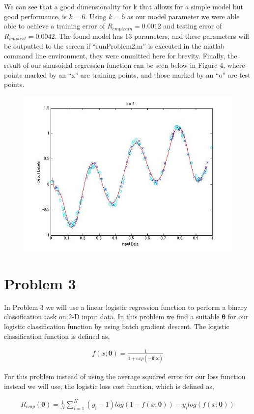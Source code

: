 \documentclass[paper=a4, fontsize=11pt]{scrartcl} %
\numberwithin{equation}{section} %
\numberwithin{figure}{section} %
\numberwithin{table}{section} %
\begin{document}
We can see that a good dimensionality for k that allows for a simple model but good performance, is $k=6$.  Using $k = 6$ as our model parameter we were able able to achieve a training error of $R_{emptrain} = 0.0012$ and testing error of $R_{emptest} = 0.0042$.  The found model has 13 parameters, and these parameters will be outputted to the screen if ``runProblem2.m'' is executed in the matlab command line environment, they were ommitted here for brevity.
Finally, the result of our sinusoidal regression function can be seen below in Figure 4, where points marked by an ``x'' are training points, and those marked by an ``o'' are test points.

\begin{figure}
\centering
\includegraphics[scale=0.4]{prob2curve.jpg}
\end{figure}

\section{Problem 3}

In Problem 3 we will use a linear logistic regression function to perform a binary classification task on 2-D input data.  In this problem we find a suitable $\bm{\theta}$ for our logistic classification function by using batch gradient descent.  The logistic classification function is defined as, 

\begin{align}
f(x;\bm{\theta}) = \frac{1}{1+exp(-\bm{\theta}^t\bm{x})}
\end{align}

For this problem instead of using the average squared error for our loss function instead we will use, the logistic loss cost function, which is defined as, 

\begin{align}
R_{emp}(\bm{\theta}) = \frac{1}{N}\sum\limits_{i=1}^N(y_{i}-1)log(1-f(x;\bm{\theta})) - y_{i}log(f(x;\bm{\theta}))
\end{align}
\end{document}
